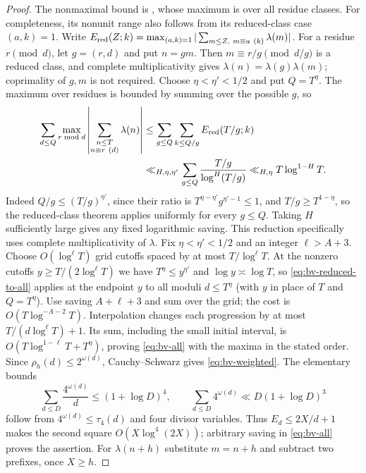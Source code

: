 \documentclass[11pt]{article}
\theoremstyle{definition}
\theoremstyle{remark}
\numberwithin{equation}{section}
\begin{document}
\begin{proof}
The nonmaximal bound is \cite[(1.5), p.~2]{PintzBV}, whose maximum is over all residue classes.
For completeness, its nonunit range also follows from its reduced-class case $(a,k)=1$.
Write $E_{\rm red}(Z;k)=\max_{(a,k)=1}|\sum_{m\le Z,\ m\equiv a\ (k)}\lambda(m)|$.
For a residue $r\pmod d$, let $g=(r,d)$ and put $n=gm$.
Then $m\equiv r/g\pmod{d/g}$ is a reduced class, and complete multiplicativity gives
$\lambda(n)=\lambda(g)\lambda(m)$; coprimality of $g,m$ is not required.
Choose $\eta<\eta'<1/2$ and put $Q=T^\eta$. The maximum over residues is bounded by summing over
the possible $g$, so
\begin{equation}\label{eq:bv-reduced-to-all}
\begin{aligned}
 \sum_{d\le Q}\max_{r\bmod d}
 \left|\sum_{\substack{n\le T\\n\equiv r\ (d)}}\lambda(n)\right|
 &\le\sum_{g\le Q}\sum_{k\le Q/g}E_{\rm red}(T/g;k)\\
 &\ll_{H,\eta,\eta'}\sum_{g\le Q}\frac{T/g}{\log^H(T/g)}
 \ll_{H,\eta}T\log^{1-H}T.
\end{aligned}
\end{equation}
Indeed $Q/g\le(T/g)^{\eta'}$, since their ratio is
$T^{\eta-\eta'}g^{\eta'-1}\le1$, and $T/g\ge T^{1-\eta}$, so the reduced-class theorem applies
uniformly for every $g\le Q$. Taking $H$ sufficiently large gives any fixed logarithmic saving.
This reduction specifically uses complete multiplicativity of $\lambda$.
Fix $\eta<\eta'<1/2$ and an integer $\ell>A+3$. Choose $O(\log^\ell T)$ grid cutoffs spaced by at most
$T/\log^\ell T$. At the nonzero cutoffs $y\ge T/(2\log^\ell T)$ we have $T^\eta\le y^{\eta'}$ and
$\log y\asymp\log T$, so \eqref{eq:bv-reduced-to-all} applies at the endpoint $y$ to all moduli $d\le T^\eta$
(with $y$ in place of $T$ and $Q=T^\eta$). Use saving $A+\ell+3$ and sum over the grid; the cost is
$O(T\log^{-A-2}T)$. Interpolation changes each progression by at most
$T/(d\log^\ell T)+1$. Its sum, including the small initial interval, is
$O(T\log^{1-\ell}T+T^\eta)$, proving \eqref{eq:bv-all} with the maxima in the stated order.
Since $\rho_h(d)\le2^{\omega(d)}$, Cauchy--Schwarz gives \eqref{eq:bv-weighted}.
The elementary bounds
\begin{equation}\label{eq:four-divisors}
 \sum_{d\le D}\frac{4^{\omega(d)}}d\le(1+\log D)^4,\qquad
 \sum_{d\le D}4^{\omega(d)}\ll D(1+\log D)^3
\end{equation}
follow from $4^{\omega(d)}\le\tau_4(d)$ and four divisor variables.
Thus $E_d\le2X/d+1$ makes the second square $O(X\log^4(2X))$; arbitrary saving in
\eqref{eq:bv-all} proves the assertion. For $\lambda(n+h)$ substitute $m=n+h$ and subtract two
prefixes, once $X\ge h$.
\end{proof}
\end{document}
